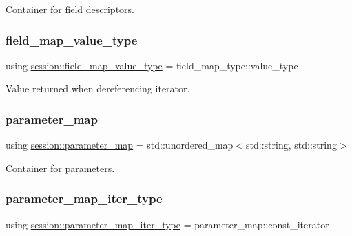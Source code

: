 Container for field descriptors. 

\mbox{\label{classsession_a8cca62aada351eadfa6976355db84882}} 
\subsubsection{\texorpdfstring{field\+\_\+map\+\_\+value\+\_\+type}{field\_map\_value\_type}}
{\footnotesize\ttfamily using \hyperlink{classsession_a8cca62aada351eadfa6976355db84882}{session\+::field\+\_\+map\+\_\+value\+\_\+type} =  field\+\_\+map\+\_\+type\+::value\+\_\+type}



Value returned when dereferencing iterator. 

\mbox{\label{classsession_af41613cd234dabc0d89257e1444ea0a9}} 
\subsubsection{\texorpdfstring{parameter\+\_\+map}{parameter\_map}}
{\footnotesize\ttfamily using \hyperlink{classsession_af41613cd234dabc0d89257e1444ea0a9}{session\+::parameter\+\_\+map} =  std\+::unordered\+\_\+map$<$std\+::string, std\+::string$>$}



Container for parameters. 

\mbox{\label{classsession_a1e824e1c18e52914acbf25408989622f}} 
\subsubsection{\texorpdfstring{parameter\+\_\+map\+\_\+iter\+\_\+type}{parameter\_map\_iter\_type}}
{\footnotesize\ttfamily using \hyperlink{classsession_a1e824e1c18e52914acbf25408989622f}{session\+::parameter\+\_\+map\+\_\+iter\+\_\+type} =  parameter\+\_\+map\+::const\+\_\+iterator}



